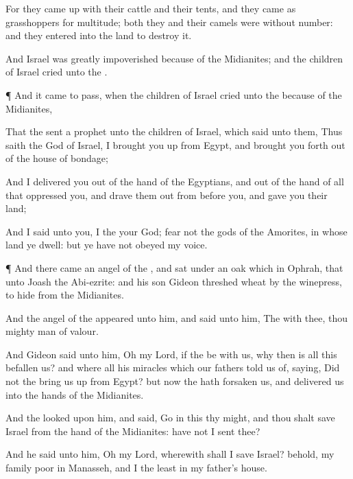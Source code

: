 {For they came
up with their
cattle and their
tents, and they
came
as
grasshoppers for
multitude;
{} both they and their
camels were without
number: and they
entered into the
land to
destroy it.

And
Israel was
greatly
impoverished
because of the
Midianites; and the
children of
Israel
cried unto the
{}.


\par }{\PP {}¶ And it came to pass, when the
children of
Israel
cried unto the
{}
because of the
Midianites,

That the
{}
sent a
prophet unto the
children of
Israel, which
said unto them, Thus
saith the
{}
God of
Israel, I brought you
up from
Egypt, and brought you
forth out of the
house of
bondage;

And I
delivered you out of the
hand of the
Egyptians, and out of the
hand of all that
oppressed you, and drave them
out from
before you, and
gave you their
land;

And I
said unto you, I
{} the
{} your
God;
fear not the
gods of the
Amorites, in whose
land ye
dwell: but ye have not
obeyed my
voice.


\par }{\PP {}¶ And there
came an
angel of the
{}, and
sat under an
oak which
{} in
Ophrah, that
{} unto
Joash the
Abi-ezrite: and his
son
Gideon
threshed
wheat by the
winepress, to
hide
{}
from the
Midianites.

And the
angel of the
{}
appeared unto him, and
said unto him, The
{}
{} with thee, thou
mighty man of
valour.

And
Gideon
said unto him,
Oh my
Lord,
if the
{} be with us, why then is all this
befallen us? and where
{} all his
miracles which our
fathers
told us of,
saying, Did not the
{} bring us
up from
Egypt? but now the
{} hath
forsaken us, and
delivered us into the
hands of the
Midianites.

And the
{}
looked upon him, and
said,
Go in this thy
might, and thou shalt
save
Israel from the
hand of the
Midianites: have not I
sent thee?

And he
said unto him,
Oh my
Lord,
wherewith shall I
save
Israel? behold, my
family
{}
poor in
Manasseh, and I
{} the
least in my
father’s
house.

}
